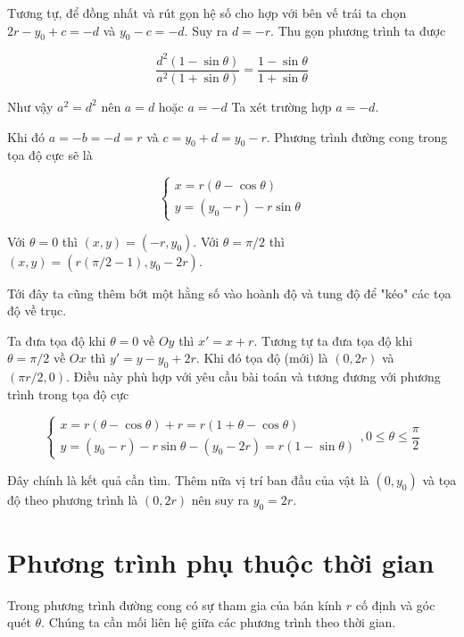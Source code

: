\documentclass{article}
\begin{document}
Tương tự, để đồng nhất và rút gọn hệ số cho hợp với bên vế trái ta chọn $2r - y_0 + c = -d$ và $y_0 - c = -d$. Suy ra $d = -r$. Thu gọn phương trình ta được

\begin{equation*}
	\frac{d^2 (1 - \sin\theta)}{a^2 (1 + \sin\theta)} = \frac{1 - \sin\theta}{1 + \sin\theta}
\end{equation*}

Như vậy $a^2 = d^2$ nên $a = d$ hoặc $a = -d$ Ta xét trường hợp $a = -d$.

Khi đó $a = -b = -d = r$ và $c = y_0 + d = y_0 - r$. Phương trình đường cong trong tọa độ cực sẽ là 

\begin{equation*}
	\begin{cases}
		x = r (\theta - \cos\theta) \\
		y = (y_0 - r) - r \sin\theta
	\end{cases}
\end{equation*}

Với $\theta = 0$ thì $(x, y) = (-r, y_0)$. Với $\theta = \pi / 2$ thì $(x, y) = (r (\pi / 2 - 1), y_0 - 2r)$.

Tới đây ta cũng thêm bớt một hằng số vào hoành độ và tung độ để "kéo" các tọa độ về trục.

Ta đưa tọa độ khi $\theta = 0$ về $Oy$ thì $x' = x + r$. Tương tự ta đưa tọa độ khi $\theta = \pi / 2$ về $Ox$ thì $y' = y - y_0 + 2r$. Khi đó tọa độ (mới) là $(0, 2r)$ và $(\pi r / 2, 0)$. Điều này phù hợp với yêu cầu bài toán và tương đương với phương trình trong tọa độ cực 

\begin{equation}
	\begin{cases}
		x = r (\theta - \cos\theta) + r = r (1 + \theta - \cos\theta) \\
		y = (y_0 - r) - r \sin\theta - (y_0 - 2r) = r (1 - \sin\theta)
	\end{cases}, 0 \leq \theta \leq \frac{\pi}{2}
\end{equation}

Đây chính là kết quả cần tìm. Thêm nữa vị trí ban đầu của vật là $(0, y_0)$ và tọa độ theo phương trình là $(0, 2r)$ nên suy ra $y_0 = 2r$.

\section{Phương trình phụ thuộc thời gian}

Trong phương trình đường cong có sự tham gia của bán kính $r$ cố định và góc quét $\theta$. Chúng ta cần mối liên hệ giữa các phương trình theo thời gian.
\end{document}
